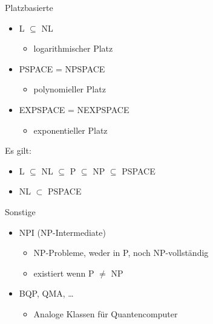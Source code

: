 \documentclass[ignorenonframetext,]{beamer}
\begin{document}
\begin{frame}{Platzbasierte}

\begin{itemize}
\itemsep1pt\parskip0pt
\item
  L $\subseteq$ NL

  \begin{itemize}
  \itemsep1pt\parskip0pt
  \item
    logarithmischer Platz
  \end{itemize}
\item
  PSPACE = NPSPACE

  \begin{itemize}
  \itemsep1pt\parskip0pt
  \item
    polynomieller Platz
  \end{itemize}
\item
  EXPSPACE = NEXPSPACE

  \begin{itemize}
  \itemsep1pt\parskip0pt
  \item
    exponentieller Platz
  \end{itemize}
\end{itemize}

Es gilt:

\begin{itemize}
\itemsep1pt\parskip0pt
\item
  L $\subseteq$ NL $\subseteq$ P $\subseteq$ NP $\subseteq$ PSPACE
\item
  NL $\subset$ PSPACE
\end{itemize}

\end{frame}

\begin{frame}{Sonstige}

\begin{itemize}
\itemsep1pt\parskip0pt
\item
  NPI (NP-Intermediate)

  \begin{itemize}
  \itemsep1pt\parskip0pt
  \item
    NP-Probleme, weder in P, noch NP-vollständig
  \item
    existiert wenn P $\neq$ NP
  \end{itemize}
\item
  BQP, QMA, \ldots{}

  \begin{itemize}
  \itemsep1pt\parskip0pt
  \item
    Analoge Klassen für Quantencomputer
  \end{itemize}
\end{itemize}

\end{frame}
\end{document}
